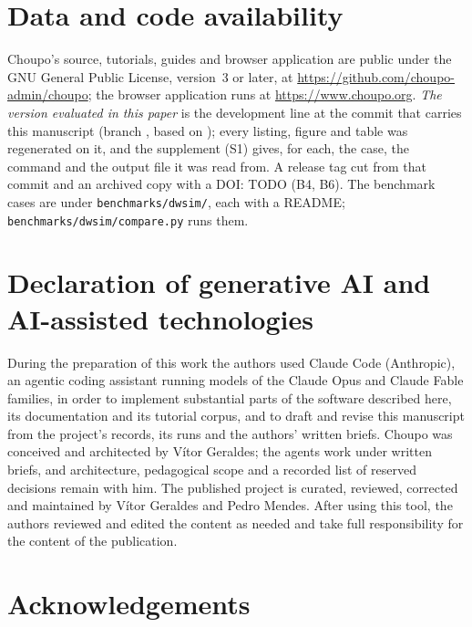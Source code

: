 \documentclass[preprint,12pt]{elsarticle}
\newcommand{\code}[1]{\texttt{\detokenize{#1}}}
\newcommand{\brk}[1]{\nolinkurl{#1}}
\begin{document}
\section*{Data and code availability}

Choupo's source, tutorials, guides and browser application are public under
the GNU General Public License, version~3 or later, at
\url{https://github.com/choupo-admin/choupo}; the browser application runs
at \url{https://www.choupo.org}.  \emph{The version evaluated in this paper}
is the development line at the commit that carries this manuscript (branch
\code{claude/c126-papers-revision}, based on \code{c11d0354a}); every
listing, figure and table was regenerated on it, and the supplement (S1)
gives, for each, the case, the command and the output file it was read
from.  A release tag cut from that commit and an archived copy with a DOI:
TODO (B4, B6).  The benchmark cases are under \brk{benchmarks/dwsim/}, each
with a README; \brk{benchmarks/dwsim/compare.py} runs them.

\section*{Declaration of generative AI and AI-assisted technologies}

During the preparation of this work the authors used Claude Code
(Anthropic), an agentic coding assistant running models of the Claude Opus
and Claude Fable families, in order to implement substantial parts of the
software described here, its documentation and its tutorial corpus, and to
draft and revise this manuscript from the project's records, its runs and
the authors' written briefs.  Choupo was conceived and architected by Vítor
Geraldes; the agents work under written briefs, and architecture,
pedagogical scope and a recorded list of reserved decisions remain with
him.  The published project is curated, reviewed, corrected and maintained
by Vítor Geraldes and Pedro Mendes.  After using this tool, the authors
reviewed and edited the content as needed and take full responsibility for
the content of the publication.

\section*{Acknowledgements}
\end{document}
